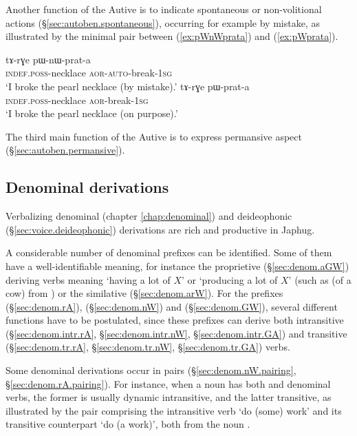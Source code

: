  
Another function of the Autive is to indicate spontaneous or non-volitional actions (§\ref{sec:autoben.spontaneous}), occurring for example by mistake, as illustrated by the minimal pair between (\ref{ex:pWnWprata}) and (\ref{ex:pWprata}).


\begin{exe}
\ex 
\begin{xlist}
\ex \label{ex:pWnWprata}
\gll tɤ-rɣe pɯ-nɯ-prat-a  \\
\textsc{indef}.\textsc{poss}-necklace \textsc{aor}-\textsc{auto}-break-\textsc{1sg}  \\
\glt `I broke the pearl necklace (by mistake).'
\ex \label{ex:pWprata}
\gll tɤ-rɣe pɯ-prat-a  \\
\textsc{indef}.\textsc{poss}-necklace \textsc{aor}-break-\textsc{1sg}  \\
\glt `I broke the pearl necklace (on purpose).' 
\end{xlist} 
\end{exe}

The third main function of the Autive is to express permansive aspect (§\ref{sec:autoben.permansive}).

\subsection{Denominal derivations}
Verbalizing denominal (chapter \ref{chap:denominal}) and deideophonic (§\ref{sec:voice.deideophonic}) derivations are rich and productive in Japhug. 

A considerable number of denominal prefixes can be identified. Some of them have a well-identifiable meaning, for instance the proprietive  (§\ref{sec:denom.aGW}) deriving verbs meaning `having a lot of $X$' or `producing a lot of $X$' (such as  (of a cow) from ) or the similative  (§\ref{sec:denom.arW}). For the prefixes  (§\ref{sec:denom.rA}),  (§\ref{sec:denom.nW}) and   (§\ref{sec:denom.GW}), several different functions have to be postulated, since these prefixes can derive both intransitive (§\ref{sec:denom.intr.rA}, §\ref{sec:denom.intr.nW}, §\ref{sec:denom.intr.GA}) and transitive (§\ref{sec:denom.tr.rA}, §\ref{sec:denom.tr.nW}, §\ref{sec:denom.tr.GA}) verbs.

Some denominal derivations occur in pairs (§\ref{sec:denom.nW.pairing}, §\ref{sec:denom.rA.pairing}). For instance, when a noun has both  and  denominal verbs, the former is usually dynamic intransitive, and the latter transitive, as illustrated by the pair comprising the intransitive verb  `do (some) work' and its transitive counterpart  `do (a work)', both from the noun .

